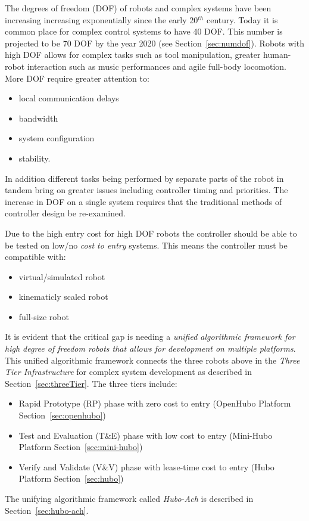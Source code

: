 The degrees of freedom (DOF) of robots and complex systems have been increasing increasing exponentially since the early 20$^{th}$ century.
Today it is common place for complex control systems to have 40 DOF. 
This number is projected to be 70 DOF by the year 2020 (see Section~\ref{sec:numdof}).
Robots with high DOF allows for complex tasks such as tool manipulation\cite{lofaroRAM2013,lofaroTePRA2013HuboAch,lofaroTePRA2013Valve,gtechIK}, greater human-robot interaction such as music performances\cite{lofaroEURASIP2011, 6094987,lofaroIASTED2011,5686847} and agile full-body locomotion\cite{lofaroHumanoids2012,lofaroGamesRobot,tepraLadder2013}.
More DOF require greater attention to:
\begin{itemize}
\item local communication delays
\item bandwidth
\item system configuration
\item stability.
\end{itemize}
In addition different tasks being performed by separate parts of the robot in tandem bring on greater issues including controller timing and priorities.
The increase in DOF on a single system requires that the traditional methods of controller design be re-examined.

Due to the high entry cost for high DOF robots the controller should be able to be tested on low/no \textit{cost to entry} systems.
This means the controller must be compatible with:
\begin{itemize}
\item virtual/simulated robot
\item kinematicly scaled robot
\item full-size robot
\end{itemize}

It is evident that the critical gap is needing a \textit{unified algorithmic framework for high degree of freedom robots that allows for development on multiple platforms}.
This unified algorithmic framework connects the three robots above in the \textit{Three Tier Infrastructure}\cite{threeTier} for complex system development as described in Section~\ref{sec:threeTier}.
The three tiers include:
\begin{itemize}
\item Rapid Prototype (RP) phase with zero cost to entry (OpenHubo Platform Section~\ref{sec:openhubo})
\item Test and Evaluation (T\&E) phase with low cost to entry (Mini-Hubo Platform Section~\ref{sec:mini-hubo})
\item Verify and Validate (V\&V) phase with lease-time cost to entry (Hubo Platform Section~\ref{sec:hubo})
\end{itemize}
The unifying algorithmic framework called \textit{Hubo-Ach}\cite{lofaroRAM2013} is described in Section~\ref{sec:hubo-ach}.


